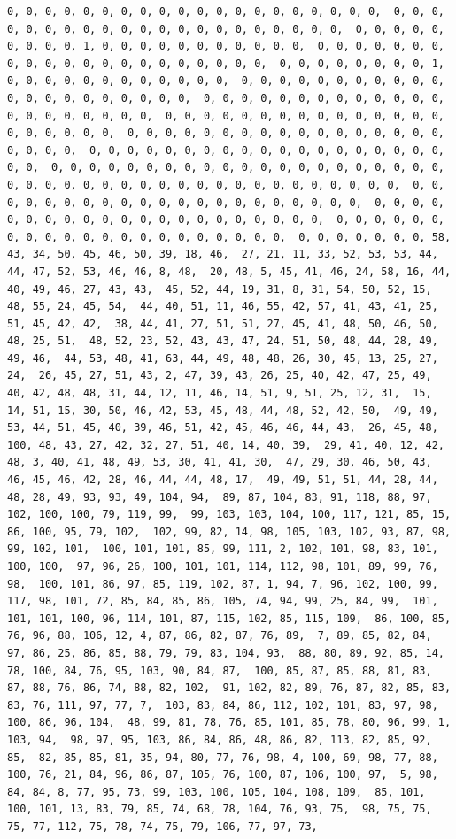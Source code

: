 \documentclass[
]{article}
\begin{document}
\begin{verbatim}
0, 0, 0, 0, 0, 0, 0, 0, 0, 0, 0, 0, 0, 0, 0, 0, 0, 0, 0, 0,  0, 0, 0, 0, 0, 0, 0, 0, 0, 0, 0, 0, 0, 0, 0, 0, 0, 0, 0, 0, 0,  0, 0, 0, 0, 0, 0, 0, 0, 0, 1, 0, 0, 0, 0, 0, 0, 0, 0, 0, 0, 0,  0, 0, 0, 0, 0, 0, 0, 0, 0, 0, 0, 0, 0, 0, 0, 0, 0, 0, 0, 0, 0,  0, 0, 0, 0, 0, 0, 0, 0, 1, 0, 0, 0, 0, 0, 0, 0, 0, 0, 0, 0, 0,  0, 0, 0, 0, 0, 0, 0, 0, 0, 0, 0, 0, 0, 0, 0, 0, 0, 0, 0, 0, 0,  0, 0, 0, 0, 0, 0, 0, 0, 0, 0, 0, 0, 0, 0, 0, 0, 0, 0, 0, 0, 0,  0, 0, 0, 0, 0, 0, 0, 0, 0, 0, 0, 0, 0, 0, 0, 0, 0, 0, 0, 0, 0,  0, 0, 0, 0, 0, 0, 0, 0, 0, 0, 0, 0, 0, 0, 0, 0, 0, 0, 0, 0, 0,  0, 0, 0, 0, 0, 0, 0, 0, 0, 0, 0, 0, 0, 0, 0, 0, 0, 0, 0, 0, 0,  0, 0, 0, 0, 0, 0, 0, 0, 0, 0, 0, 0, 0, 0, 0, 0, 0, 0, 0, 0, 0,  0, 0, 0, 0, 0, 0, 0, 0, 0, 0, 0, 0, 0, 0, 0, 0, 0, 0, 0, 0, 0,  0, 0, 0, 0, 0, 0, 0, 0, 0, 0, 0, 0, 0, 0, 0, 0, 0, 0, 0, 0, 0,  0, 0, 0, 0, 0, 0, 0, 0, 0, 0, 0, 0, 0, 0, 0, 0, 0, 0, 0, 0, 0,  0, 0, 0, 0, 0, 0, 0, 0, 0, 0, 0, 0, 0, 0, 0, 0, 0, 0, 0, 0, 0,  0, 0, 0, 0, 0, 0, 0, 58, 43, 34, 50, 45, 46, 50, 39, 18, 46,  27, 21, 11, 33, 52, 53, 53, 44, 44, 47, 52, 53, 46, 46, 8, 48,  20, 48, 5, 45, 41, 46, 24, 58, 16, 44, 40, 49, 46, 27, 43, 43,  45, 52, 44, 19, 31, 8, 31, 54, 50, 52, 15, 48, 55, 24, 45, 54,  44, 40, 51, 11, 46, 55, 42, 57, 41, 43, 41, 25, 51, 45, 42, 42,  38, 44, 41, 27, 51, 51, 27, 45, 41, 48, 50, 46, 50, 48, 25, 51,  48, 52, 23, 52, 43, 43, 47, 24, 51, 50, 48, 44, 28, 49, 49, 46,  44, 53, 48, 41, 63, 44, 49, 48, 48, 26, 30, 45, 13, 25, 27, 24,  26, 45, 27, 51, 43, 2, 47, 39, 43, 26, 25, 40, 42, 47, 25, 49,  40, 42, 48, 48, 31, 44, 12, 11, 46, 14, 51, 9, 51, 25, 12, 31,  15, 14, 51, 15, 30, 50, 46, 42, 53, 45, 48, 44, 48, 52, 42, 50,  49, 49, 53, 44, 51, 45, 40, 39, 46, 51, 42, 45, 46, 46, 44, 43,  26, 45, 48, 100, 48, 43, 27, 42, 32, 27, 51, 40, 14, 40, 39,  29, 41, 40, 12, 42, 48, 3, 40, 41, 48, 49, 53, 30, 41, 41, 30,  47, 29, 30, 46, 50, 43, 46, 45, 46, 42, 28, 46, 44, 44, 48, 17,  49, 49, 51, 51, 44, 28, 44, 48, 28, 49, 93, 93, 49, 104, 94,  89, 87, 104, 83, 91, 118, 88, 97, 102, 100, 100, 79, 119, 99,  99, 103, 103, 104, 100, 117, 121, 85, 15, 86, 100, 95, 79, 102,  102, 99, 82, 14, 98, 105, 103, 102, 93, 87, 98, 99, 102, 101,  100, 101, 101, 85, 99, 111, 2, 102, 101, 98, 83, 101, 100, 100,  97, 96, 26, 100, 101, 101, 114, 112, 98, 101, 89, 99, 76, 98,  100, 101, 86, 97, 85, 119, 102, 87, 1, 94, 7, 96, 102, 100, 99,  117, 98, 101, 72, 85, 84, 85, 86, 105, 74, 94, 99, 25, 84, 99,  101, 101, 101, 100, 96, 114, 101, 87, 115, 102, 85, 115, 109,  86, 100, 85, 76, 96, 88, 106, 12, 4, 87, 86, 82, 87, 76, 89,  7, 89, 85, 82, 84, 97, 86, 25, 86, 85, 88, 79, 79, 83, 104, 93,  88, 80, 89, 92, 85, 14, 78, 100, 84, 76, 95, 103, 90, 84, 87,  100, 85, 87, 85, 88, 81, 83, 87, 88, 76, 86, 74, 88, 82, 102,  91, 102, 82, 89, 76, 87, 82, 85, 83, 83, 76, 111, 97, 77, 7,  103, 83, 84, 86, 112, 102, 101, 83, 97, 98, 100, 86, 96, 104,  48, 99, 81, 78, 76, 85, 101, 85, 78, 80, 96, 99, 1, 103, 94,  98, 97, 95, 103, 86, 84, 86, 48, 86, 82, 113, 82, 85, 92, 85,  82, 85, 85, 81, 35, 94, 80, 77, 76, 98, 4, 100, 69, 98, 77, 88,  100, 76, 21, 84, 96, 86, 87, 105, 76, 100, 87, 106, 100, 97,  5, 98, 84, 84, 8, 77, 95, 73, 99, 103, 100, 105, 104, 108, 109,  85, 101, 100, 101, 13, 83, 79, 85, 74, 68, 78, 104, 76, 93, 75,  98, 75, 75, 75, 77, 112, 75, 78, 74, 75, 79, 106, 77, 97, 73,  
\end{verbatim}
\end{document}
